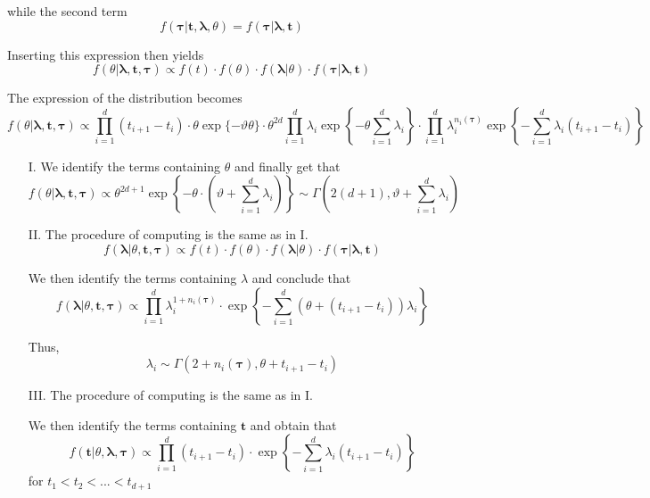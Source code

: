 \documentclass{article}
\begin{document}
while the second term \[f(\boldsymbol{\tau}| \boldsymbol{t}, \boldsymbol{\lambda},\theta)= f(\boldsymbol{\tau}| \boldsymbol{\lambda}, \boldsymbol{t})\]

Inserting this expression then yields
\[ f(\theta| \boldsymbol{\lambda}, \boldsymbol{t}, \boldsymbol{\tau}) \propto f(t) \cdot f(\theta) \cdot  f(\boldsymbol{\lambda}|\theta)  \cdot f(\boldsymbol{\tau}|\boldsymbol{\lambda},\boldsymbol{t})\]

The expression of the distribution becomes
\[ f(\theta | \boldsymbol{\lambda}, \boldsymbol{t}, \boldsymbol{\tau}) \propto \prod^d_{i = 1}(t_{i+1} - t_i) \cdot \theta \exp\{-\vartheta \theta\}\cdot \theta^{2d}\prod^d_{i = 1}\lambda_i \exp \left \{ -\theta \sum^d_{i=1}\lambda_i \right \} \cdot \prod^d_{i=1}\lambda_i^{n_i(\boldsymbol{\tau})} \exp \left \{ - \sum^d_{i = 1}\lambda_i(t_{i+1} - t_i) \right \} \]

\begin{itemize}
\item[I.] We identify the terms containing $\theta$ and finally get that
\[f(\theta | \boldsymbol{\lambda},\boldsymbol{t},\boldsymbol{\tau}) \propto \theta^{2d + 1}\exp\left \{ -\theta \cdot \left ( \vartheta + \sum^d_{i = 1}\lambda_i \right) \right \} \sim \Gamma\left (2(d + 1), \vartheta + \sum^d_{i = 1}\lambda_i\right )\]

\item[II.] The procedure of computing is the same as in I. 
\[f(\boldsymbol{\lambda}|\theta,\boldsymbol{t},\boldsymbol{\tau}) \propto f(t) \cdot f(\theta) \cdot  f(\boldsymbol{\lambda}|\theta)  \cdot f(\boldsymbol{\tau}|\boldsymbol{\lambda},\boldsymbol{t})\]

We then identify the terms containing $\lambda$ and conclude that
\[f(\boldsymbol{\lambda}|\theta,\boldsymbol{t},\boldsymbol{\tau}) \propto \prod^d_{i=1}\lambda_i^{1 + n_i(\boldsymbol{\tau})}\cdot \exp\left \{ - \sum^d_{i = 1}(\theta + (t_{i+1} - t_i))\lambda_i \right \}  \]

Thus,
\[ \lambda_i \sim\Gamma \left ( 2 + n_i(\boldsymbol{\tau}), \theta + t_{i+1} - t_i \right ) \]

\item[III.] The procedure of computing is the same as in I.

We then identify the terms containing $\boldsymbol{t}$ and obtain that
\[f(\boldsymbol{t}|\theta, \boldsymbol{\lambda},\boldsymbol{\tau}) \propto \prod^d_{i = 1}(t_{i+1} - t_i) \cdot \exp \left \{ -\sum^d_{i = 1}\lambda_i(t_{i+1} - t_i) \right \} \]  for $t_1<t_2<...<t_{d+1}$

\end{itemize}
\end{document}
